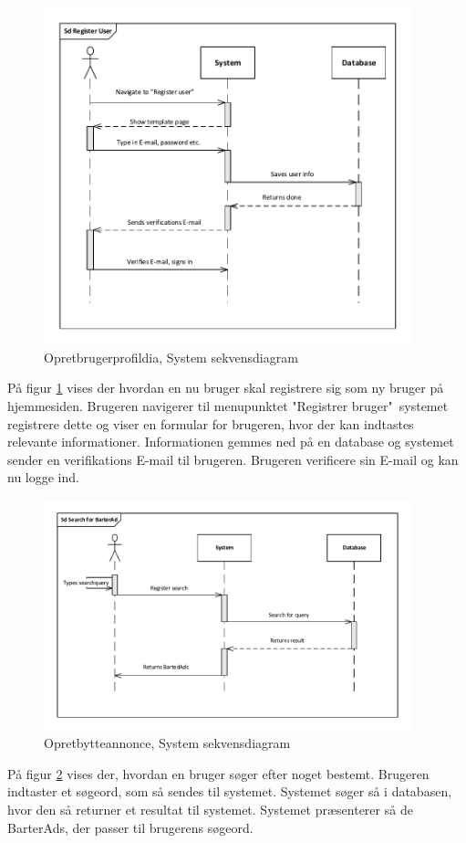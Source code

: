 	
\begin{figure}[H]
	\includegraphics[trim = 6mm 6mm 6mm 6mm, clip, width=0.95\textwidth]{figures/SekvensdiagramOpretBrugerprofil.PDF}
	\caption{Opretbrugerprofildia, System sekvensdiagram }
	\label{fig:SDOpretBrugerprofildia}
\end{figure}

\noindent På figur \ref{fig:SDOpretBrugerprofildia} vises der hvordan en nu bruger skal registrere sig som ny bruger på hjemmesiden. Brugeren navigerer til menupunktet "Registrer bruger"\, systemet registrere dette og viser en formular for brugeren, hvor der kan indtastes relevante informationer. Informationen gemmes ned på en database og systemet sender en verifikations E-mail til brugeren. Brugeren verificere sin E-mail og kan nu logge ind.

\begin{figure}[H]
	\includegraphics[trim = 6mm 6mm 6mm 6mm, clip, width=0.95\textwidth]{figures/SDSearchBartedAd.PDF}
	\caption{Opretbytteannonce, System sekvensdiagram }
	\label{fig:SDSearchBarterAd}
	\centering
\end{figure}

\noindent På figur \ref{fig:SDSearchBarterAd} vises der, hvordan en bruger søger efter noget bestemt. Brugeren indtaster et søgeord, som så sendes til systemet. Systemet søger så i databasen, hvor den så returner et resultat til systemet. Systemet præsenterer så  de BarterAds, der passer til brugerens søgeord. 